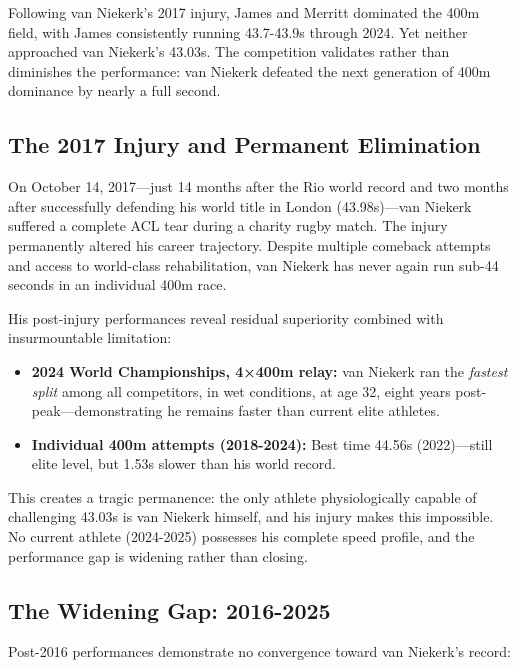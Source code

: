 \documentclass[twocolumn,10pt]{article}
\begin{document}
Following van Niekerk's 2017 injury, James and Merritt dominated the 400m field, with James consistently running 43.7-43.9s through 2024. Yet neither approached van Niekerk's 43.03s. The competition validates rather than diminishes the performance: van Niekerk defeated the next generation of 400m dominance by nearly a full second.

\subsection{The 2017 Injury and Permanent Elimination}

On October 14, 2017—just 14 months after the Rio world record and two months after successfully defending his world title in London (43.98s)—van Niekerk suffered a complete ACL tear during a charity rugby match. The injury permanently altered his career trajectory. Despite multiple comeback attempts and access to world-class rehabilitation, van Niekerk has never again run sub-44 seconds in an individual 400m race.

His post-injury performances reveal residual superiority combined with insurmountable limitation:

\begin{itemize}
    \item \textbf{2024 World Championships, 4×400m relay:} van Niekerk ran the \textit{fastest split} among all competitors, in wet conditions, at age 32, eight years post-peak—demonstrating he remains faster than current elite athletes.

    \item \textbf{Individual 400m attempts (2018-2024):} Best time 44.56s (2022)—still elite level, but 1.53s slower than his world record.
\end{itemize}

This creates a tragic permanence: the only athlete physiologically capable of challenging 43.03s is van Niekerk himself, and his injury makes this impossible. No current athlete (2024-2025) possesses his complete speed profile, and the performance gap is widening rather than closing.

\subsection{The Widening Gap: 2016-2025}

Post-2016 performances demonstrate no convergence toward van Niekerk's record:
\end{document}
